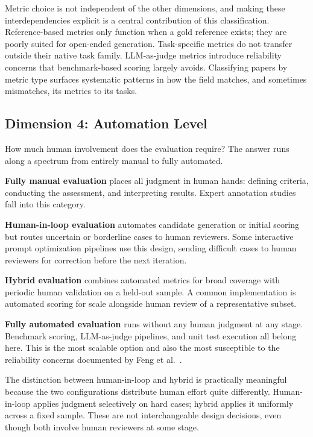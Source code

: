 \documentclass[journal]{IEEEtran}
\begin{document}
Metric choice is not independent of the other dimensions, and making these
interdependencies explicit is a central contribution of this classification. Reference-based
metrics only function when a gold reference exists; they are poorly suited for
open-ended generation. Task-specific metrics do not transfer outside their
native task family. LLM-as-judge metrics introduce reliability concerns that
benchmark-based scoring largely avoids. Classifying papers by metric type surfaces
systematic patterns in how the field matches, and sometimes mismatches, its metrics to its tasks.

\subsection{Dimension 4: Automation Level}

How much human involvement does the evaluation require? The answer runs along
a spectrum from entirely manual to fully automated.

\textbf{Fully manual evaluation} places all judgment in human hands:
defining criteria, conducting the assessment, and interpreting results. Expert
annotation studies fall into this category.

\textbf{Human-in-loop evaluation} automates candidate generation or
initial scoring but routes uncertain or borderline cases to human reviewers.
Some interactive prompt optimization pipelines use this design, sending difficult
cases to human reviewers for correction before the next iteration.

\textbf{Hybrid evaluation} combines automated metrics for broad coverage
with periodic human validation on a held-out sample. A common
implementation is automated scoring for scale alongside human review of
a representative subset.

\textbf{Fully automated evaluation} runs without any human judgment
at any stage. Benchmark scoring, LLM-as-judge pipelines,
and unit test execution all belong here. This is the most scalable option and
also the most susceptible to the reliability concerns documented by
Feng et al.~\cite{feng2025sage}.

The distinction between human-in-loop and hybrid is practically meaningful
because the two configurations distribute human effort quite differently. Human-in-loop applies
judgment selectively on hard cases; hybrid applies it uniformly across a
fixed sample. These are not interchangeable design decisions, even though both
involve human reviewers at some stage.
\end{document}
